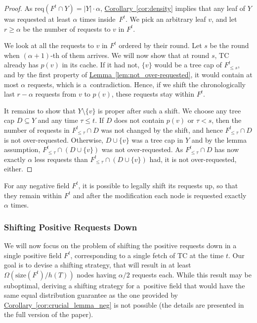 \documentclass[sigconf,screen=true]{acmart}
\newcommand{\lref}[2][]{\hyperref[#2]{#1~\ref*{#2}}}
\newcommand{\ALG}{\textsc{TC}\xspace}
\newcommand{\size}{\textrm{size}}
\newcommand{\req}{\textrm{req}}
\begin{document}
\begin{proof}
As $\req(F^t \cap Y) = |Y| \cdot \alpha$, \lref[Corollary]{cor:density}
implies that any leaf of $Y$ was requested at least $\alpha$ times
inside~$F^t$. We pick an arbitrary leaf $v$, and let $r \geq \alpha$ be the
number of requests to $v$ in $F^t$.

We look at all the requests to $v$ in $F^t$ ordered by their round. Let $s$ be
the round when $(\alpha+1)$-th of them arrives. We will now show that at round
$s$, \ALG already has $p(v)$ in its cache. If it had not, $\{v\}$ would be a
tree cap of $F^t_{\leq s}$, and by the first property of
\lref[Lemma]{lem:not_over-requested}, it would contain at most $\alpha$
requests, which is a~contradiction. Hence, if we shift the chronologically
last $r - \alpha$ requests from $v$ to $p(v)$, these requests stay within
$F^t$.

It remains to show that $Y \setminus \{v\}$ is proper after such a shift. We
choose any tree cap $D \subseteq Y$ and any time \mbox{$\tau \leq t$}. If $D$
does not contain $p(v)$ or $\tau < s$, then the number of requests in
$F^t_{\leq \tau} \cap D$ was not changed by the shift, and hence $F^t_{\leq
\tau} \cap D$ is not over-requested. Otherwise, $D \cup \{v\}$ was a tree cap
in $Y$ and by the lemma assumption, $F^t_{\leq \tau} \cap (D \cup \{v\})$ was
not over-requested. As $F^t_{\leq \tau} \cap D$ has now exactly $\alpha$ less
requests than $F^t_{\leq \tau} \cap (D \cup \{v\})$ had, it is not
over-requested, either.
\end{proof}

\begin{corollary}
\label{cor:crucial_lemma_neg}
For any negative field $F^t$, it is possible to legally shift its requests up,
so that they remain within $F^t$ and after the modification each node is
requested exactly $\alpha$ times.
\end{corollary}



\subsubsection{Shifting Positive Requests Down}
\label{sec:positive_shifting}

We will now focus on the problem of shifting the positive requests down in a
single positive field $F^t$, corresponding to a single fetch of \ALG at the
time $t$. Our goal is to devise a shifting strategy, that will result in at
least $\Omega(\size(F^t)/h(T))$ nodes having $\alpha/2$ requests each. While
this result may be suboptimal, deriving a shifting strategy for a~positive
field that would have the same equal distribution guarantee as the one
provided by \lref[Corollary]{cor:crucial_lemma_neg} is not possible 
(the details are presented in the full version of the paper).
\end{document}
